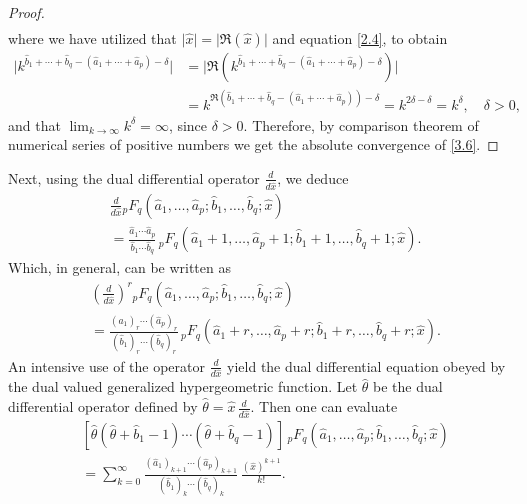\documentclass[11pt,a4paper,fleqn]{article}
\numberwithin{equation}{section}
\numberwithin{lemma}{section}
\numberwithin{theorem}{section}
\numberwithin{corollary}{section}
\begin{document}
\begin{proof}
\begin{align}
	\end{align}
where we have utilized that $\vert \widehat{x}\vert = \vert \Re (\widehat{x})\vert$ and equation \eqref{2.4}, to obtain 
\begin{align}
	\vert k^{\widehat{b}_1 + \cdots + \widehat{b}_q - (\widehat{a}_1 + \cdots + \widehat{a}_p) - \delta} \vert & = \vert \Re \left(k^{\widehat{b}_1 + \cdots + \widehat{b}_q - (\widehat{a}_1 + \cdots + \widehat{a}_p) - \delta}\right)\vert\nonumber\\
	& = k^{\Re(\widehat{b}_1 + \cdots + \widehat{b}_q - (\widehat{a}_1 + \cdots + \widehat{a}_p)) - \delta} = k^{2 \delta - \delta} = k^\delta, \quad \delta > 0,
\end{align}	
and that $\lim_{k \to \infty} k^\delta = \infty$, since $\delta > 0$. %
	Therefore, by comparison theorem of numerical series of positive numbers we get the absolute convergence of \eqref{3.6}.
\end{proof}
Next, using the dual differential operator $\frac{d}{d \widehat{x}}$, we deduce
\begin{align}
	& \frac{d}{d \widehat{x}} {}_pF_q (\widehat{a}_1, \dots, \widehat{a}_p; \widehat{b}_1, \dots, \widehat{b}_q;  \widehat{x})\nonumber\\
	& = \frac{\widehat{a}_1 \cdots \widehat{a}_p}{\widehat{b}_1 \cdots \widehat{b}_q} \, {}_pF_q (\widehat{a}_1 + 1, \dots, \widehat{a}_p + 1; \widehat{b}_1 + 1, \dots, \widehat{b}_q + 1;  \widehat{x}).
\end{align}
Which, in general, can be written as
\begin{align}
	& \left(\frac{d}{d \widehat{x}}\right)^r {}_pF_q (\widehat{a}_1, \dots, \widehat{a}_p; \widehat{b}_1, \dots, \widehat{b}_q;  \widehat{x})\nonumber\\
	& = \frac{(\widehat{a}_1)_r \cdots (\widehat{a}_p)_r}{(\widehat{b}_1)_r \cdots (\widehat{b}_q)_r} \, {}_pF_q (\widehat{a}_1 + r, \dots, \widehat{a}_p + r; \widehat{b}_1 + r, \dots, \widehat{b}_q + r;  \widehat{x}).
\end{align}
An intensive use of the operator $\frac{d}{d \widehat{x}}$ yield the dual differential equation obeyed by the dual valued generalized hypergeometric function. Let $\widehat{\theta}$ be the dual differential operator defined by $\widehat{\theta} = \widehat{x} \, \frac{d}{d \widehat{x}}$. Then one can evaluate
\begin{align}
	& [\widehat{\theta} (\widehat{\theta} + \widehat{b}_1 - 1) \cdots (\widehat{\theta} + \widehat{b}_q - 1)] \, {}_pF_q (\widehat{a}_1, \dots, \widehat{a}_p; \widehat{b}_1, \dots, \widehat{b}_q;  \widehat{x})\nonumber\\
	& = \sum_{k = 0}^{\infty} \frac{(\widehat{a}_1)_{k + 1} \cdots (\widehat{a}_p)_{k + 1}}{(\widehat{b}_1)_k \cdots (\widehat{b}_q)_k} \, \frac{ (\widehat{x})^{k + 1}}{k!}. \label{4.6}
\end{align}
\end{document}
